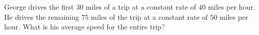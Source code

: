 George drives the first $30$ miles of a trip at a constant rate of $40$ miles per hour. He drives the remaining $75$ miles of the trip at a constant rate of $50$ miles per hour. What is his average speed for the entire trip?
